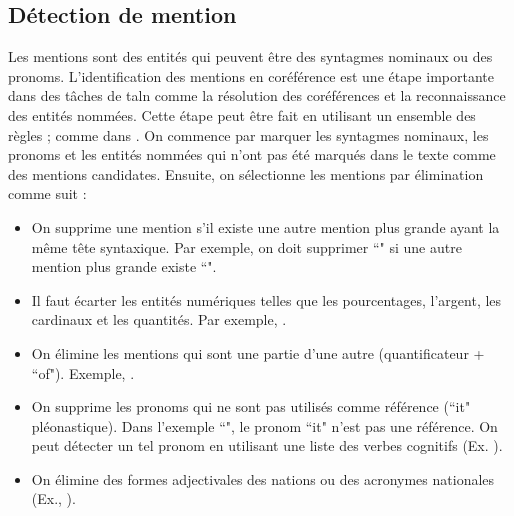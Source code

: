 \documentclass{KodeBook}
\begin{document}
\subsection{Détection de mention}

Les mentions sont des entités qui peuvent être des syntagmes nominaux ou des pronoms.
L'identification des mentions en coréférence est une étape importante dans des tâches de \ac{taln} comme la résolution des coréférences et la reconnaissance des entités nommées.
Cette étape peut être fait en utilisant un ensemble des règles ; comme dans \cite{2013-lee-al}.
On commence par marquer les syntagmes nominaux, les pronoms et les entités nommées qui n'ont pas été marqués dans le texte comme des mentions candidates. 
Ensuite, on sélectionne les mentions par élimination comme suit :
\begin{itemize}
	\item On supprime une mention s'il existe une autre mention plus grande ayant la même tête syntaxique. 
	Par exemple, on doit supprimer ``" si une autre mention plus grande existe ``". 
	
	\item Il faut écarter les entités numériques telles que les pourcentages, l'argent, les cardinaux et les quantités. 
	Par exemple, .
	
	\item On élimine les mentions qui sont une partie d'une autre (quantificateur + ``of"). 
	Exemple, .
	
	\item On supprime les pronoms qui ne sont pas utilisés comme référence (``it" pléonastique). 
	Dans l'exemple ``", le pronom ``it" n'est pas une référence. 
	On peut détecter un tel pronom en utilisant une liste des verbes cognitifs (Ex. ).
	
	\item On élimine des formes adjectivales des nations ou des acronymes nationales (Ex.,
	).
\end{itemize}
\end{document}
